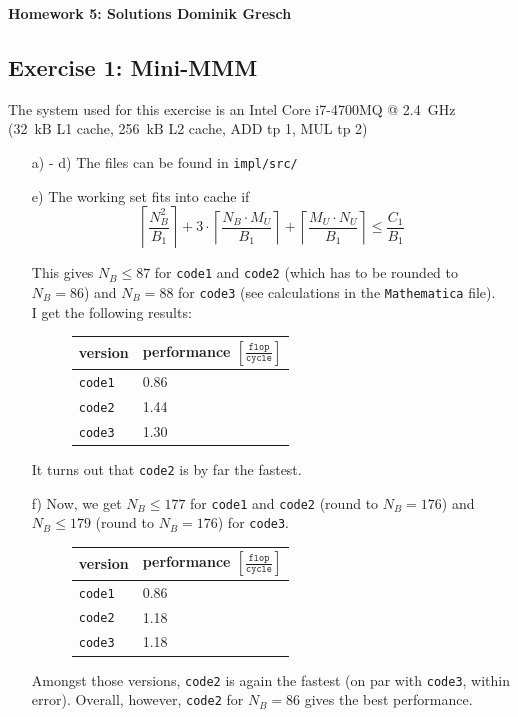 \documentclass[11pt]{article}
\newcommand{\unit}[1]{\ensuremath{\, \mathrm{#1}}}			%
\begin{document}
\hspace{0.2 in}
\begin{center}
	\begin{Large}
		\textbf{Homework 5: Solutions Dominik Gresch}
	\end{Large}
\end{center}
\subsection*{Exercise 1: Mini-MMM}
	The system used for this exercise is an Intel Core i7-4700MQ @ 2.4 $\unit{GHz}$ \\(32 \unit{kB} L1 cache, 256 \unit{kB} L2 cache, ADD tp 1, MUL tp 2)
	\begin{itemize}
		\item[a) - d)] The files can be found in \texttt{impl/src/} 
		\item[e)] The working set fits into cache if
			\[ \left\lceil \frac{N_B^2}{B_1} \right \rceil +  3 \cdot \left \lceil \frac{N_B\cdot M_U}{B_1} \right \rceil + \left \lceil \frac{M_U \cdot N_U}{B_1} \right\rceil \leq \frac{C_1}{B_1}  \]
			
			This gives $N_B \leq 87$ for \texttt{code1} and \texttt{code2} (which has to be rounded to $N_B = 86$) and $N_B = 88$ for \texttt{code3} (see calculations in the \texttt{Mathematica} file).\\
			I get the following results:
			\begin{figure}[H]\centering
				\begin{tabular}{l|l}

				version & performance $[\mathtt{\frac{flop}{cycle}}]$\\\hline
				\texttt{code1} & 0.86 \\
				\texttt{code2} & 1.44 \\
				\texttt{code3} & 1.30
				\end{tabular}
			\end{figure}
			It turns out that \texttt{code2} is by far the fastest.
		\item[f)] Now, we get $N_B \leq 177$ for \texttt{code1} and \texttt{code2} (round to $N_B = 176$) and $N_B \leq 179$ (round to $N_B = 176$) for \texttt{code3}.
		\begin{figure}[H]\centering
			\begin{tabular}{l|l}	
				version & performance $[\mathtt{\frac{flop}{cycle}}]$\\\hline
				\texttt{code1} & 0.86 \\
				\texttt{code2} & 1.18 \\	
				\texttt{code3} & 1.18
			\end{tabular}
		\end{figure}
		Amongst those versions, \texttt{code2} is again the fastest (on par with \texttt{code3}, within error). Overall, however, \texttt{code2} for $N_B = 86$ gives the best performance.
	\end{itemize}
	\newpage
\end{document}
